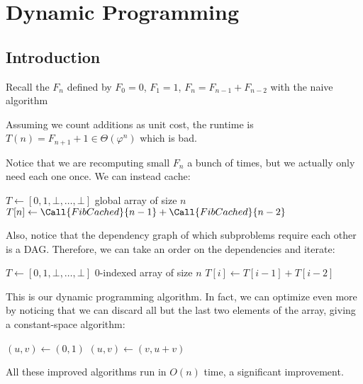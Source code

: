 \chapter{Dynamic Programming}
\section{Introduction}

Recall the  $F_n$ defined by
$F_0 = 0$, $F_1 = 1$, $F_n = F_{n-1} + F_{n-2}$ with the naive algorithm
\begin{algorithm}[H]
  \caption{}
  \begin{algorithmic}[1]
    \Else
    \EndIf
  \end{algorithmic}
\end{algorithm}
Assuming we count additions as unit cost,
the runtime is $T(n) = F_{n+1} + 1 \in \Theta(\varphi^n)$ which is bad.

Notice that we are recomputing small $F_n$ a bunch of times,
but we actually only need each one once.
We can instead cache:
\begin{algorithm}[H]
  \caption{}
  \begin{algorithmic}[1]
    \Require $T \gets [0,1,\bot,\dotsc,\bot]$ global array of size $n$
     \State $T[n] \gets \Call{FibCached}{n-1} + \Call{FibCached}{n-2}$ \EndIf
    \State {}
  \end{algorithmic}
\end{algorithm}
Also, notice that the dependency graph of which subproblems require each other is a DAG.
Therefore, we can take an order on the dependencies and iterate:
\begin{algorithm}
  \caption{}
  \begin{algorithmic}[1]
    \State $T \gets [0,1,\bot,\dotsc,\bot]$ 0-indexed array of size $n$
      \State $T[i] \gets T[i-1] + T[i-2]$
    \EndFor
    \State {}
  \end{algorithmic}
\end{algorithm}
This is our dynamic programming algorithm.
In fact, we can optimize even more by noticing that we can discard
all but the last two elements of the array,
giving a constant-space algorithm:
\begin{algorithm}[H]
  \caption{}
  \begin{algorithmic}[1]
    \State $(u,v) \gets (0,1)$
      \State $(u,v) \gets (v,u+v)$
    \EndFor
  \end{algorithmic}
\end{algorithm}
All these improved algorithms run in $O(n)$ time, a significant improvement.

